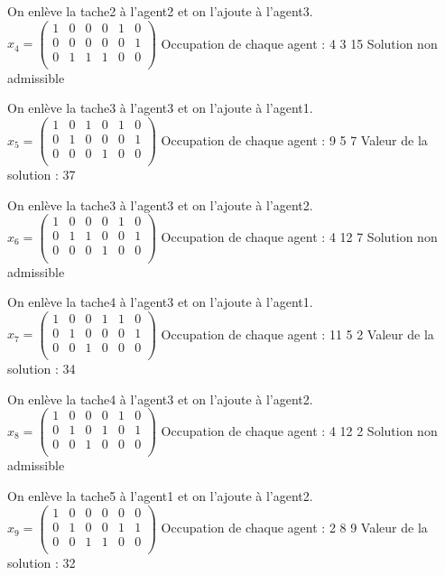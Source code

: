 \documentclass[a4paper,12pt,titlepage]{report}
\begin{document}
On enlève la tache2 à l'agent2 et on l'ajoute à l'agent3.
$x_{4} = \begin{pmatrix}
 1&0&0&0&1&0 \\
 0&0&0&0&0&1 \\
 0&1&1&1&0&0 \\
\end{pmatrix}$
Occupation de chaque agent : 4 3 15
Solution non admissible

On enlève la tache3 à l'agent3 et on l'ajoute à l'agent1.
$x_{5} = \begin{pmatrix}
 1&0&1&0&1&0 \\
 0&1&0&0&0&1 \\
 0&0&0&1&0&0 \\
\end{pmatrix}$
Occupation de chaque agent : 9 5 7
Valeur de la solution : 37

On enlève la tache3 à l'agent3 et on l'ajoute à l'agent2.
$x_{6} = \begin{pmatrix}
 1&0&0&0&1&0 \\
 0&1&1&0&0&1 \\
 0&0&0&1&0&0 \\
\end{pmatrix}$
Occupation de chaque agent : 4 12 7
Solution non admissible

On enlève la tache4 à l'agent3 et on l'ajoute à l'agent1.
$x_{7} = \begin{pmatrix}
 1&0&0&1&1&0 \\
 0&1&0&0&0&1 \\
 0&0&1&0&0&0 \\
\end{pmatrix}$
Occupation de chaque agent : 11 5 2
Valeur de la solution : 34

On enlève la tache4 à l'agent3 et on l'ajoute à l'agent2.
$x_{8} = \begin{pmatrix}
 1&0&0&0&1&0 \\
 0&1&0&1&0&1 \\
 0&0&1&0&0&0 \\
\end{pmatrix}$
Occupation de chaque agent : 4 12 2
Solution non admissible

On enlève la tache5 à l'agent1 et on l'ajoute à l'agent2.
$x_{9} = \begin{pmatrix}
 1&0&0&0&0&0 \\
 0&1&0&0&1&1 \\
 0&0&1&1&0&0 \\
\end{pmatrix}$
Occupation de chaque agent : 2 8 9
Valeur de la solution : 32
\end{document}
